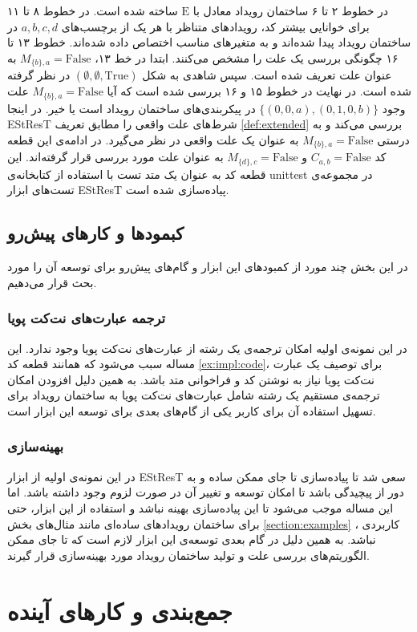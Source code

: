 \documentclass[
msc,
irfonts
]{./tex/tehran-thesis}
\newcommand{\پ}{پروژه/پایان‌نامه/رساله }
\theoremstyle{definition}
\theoremstyle{theorem}
\theoremstyle{definition}
\numberwithin{algorithm}{chapter}
\newcommand{\F}{\mathrm{False}}
\newcommand{\T}{\mathrm{True}}
\newcommand{\s}[1]{\{#1\}}
\newcommand{\e}{\emptyset}
\newcommand{\mr}[1]{\mathrm{#1}}
\newcommand{\lf}[1]{\LTRfootnote{#1}}
\begin{document}
در خطوط ۲ تا ۶ ساختمان رویداد معادل با 
$\mr{E}$
ساخته شده است.
در خطوط ۸ تا ۱۱ برای خوانایی بیشتر کد، رویداد‌های متناظر با هر یک از برچسب‌های 
$a,b,c,d$
در ساختمان رویداد پیدا شده‌اند و به متغیر‌های مناسب اختصاص داده شده‌اند.
خطوط ۱۳ تا ۱۶ چگونگی بررسی یک علت را مشخص می‌کنند.
ابتدا در خط ۱۳،
$M_{\s{b},a} = \F$
به عنوان علت تعریف شده است.
سپس شاهدی به شکل 
$(\e,\e,\T)$
در نظر گرفته شده است.
در نهایت در خطوط ۱۵ و ۱۶ بررسی شده است که آیا 
$M_{\s{b},a} = \F$
علت وجود
$\s{(0,0,a),(0,1,0,b)}$
در پیکربندی‌های ساختمان رویداد است یا خیر.
در اینجا 
EStResT
شرط‌های علت واقعی را مطابق تعریف 
\ref{def:extended}
بررسی می‌کند و
به درستی 
$M_{\s{b},a} = \F$
به عنوان یک علت واقعی در نظر می‌گیرد.
در ادامه‌ی این قطعه کد 
$C_{a,b} = \F$
و 
$M_{\s{d},c} = \F$
به عنوان علت مورد بررسی قرار گرفته‌اند.
این قطعه کد به عنوان یک متد تست با استفاده از کتابخانه‌ی 
unittest
در مجموعه‌ی تست‌های ابزار 
EStResT
پیاده‌سازی شده است.

\section{کبمودها و کار‌های پیش‌رو}
در این بخش چند مورد از کمبود‌های این ابزار و گام‌های پیش‌رو برای 
توسعه آن را مورد بحث قرار می‌دهیم.

\subsection{ترجمه عبارت‌های 
نت‌کت پویا
}
در این نمونه‌ی اولیه امکان ترجمه‌ی یک رشته
\lf{String}
از عبارت‌های نت‌کت پویا وجود ندارد.
این مساله سبب می‌شود که همانند قطعه کد
\ref{ex:impl:code}،
برای توصیف یک عبارت نت‌کت پویا نیاز به نوشتن کد و فراخوانی متد باشد.
به همین دلیل افزودن امکان ترجمه‌ی مستقیم یک رشته شامل عبارت‌های نت‌کت پویا به 
ساختمان رویداد برای تسهیل استفاده آن برای کاربر یکی از گام‌های بعدی برای توسعه این ابزار است.

\subsection{بهینه‌سازی}
در این نمونه‌ی اولیه از ابزار 
EStResT
سعی شد تا پیاده‌سازی تا جای ممکن ساده و به دور از پیچیدگی باشد تا امکان توسعه و تغییر آن در صورت لزوم وجود داشته باشد.
اما این مساله موجب می‌شود تا این پیاده‌سازی بهینه نباشد و استفاده
از این ابزار، حتی برای ساختمان رویداد‌های ساده‌ای مانند مثال‌های 
بخش
\ref{section:examples}
،
کاربردی نباشد.
به همین دلیل در گام بعدی توسعه‌ی این ابزار لازم است که تا جای ممکن 
الگوریتم‌های بررسی علت و تولید ساختمان رویداد مورد
 بهینه‌سازی قرار گیرند.\clearpage{}
\clearpage{}\chapter{جمع‌بندی و کار‌های آینده}
\end{document}
